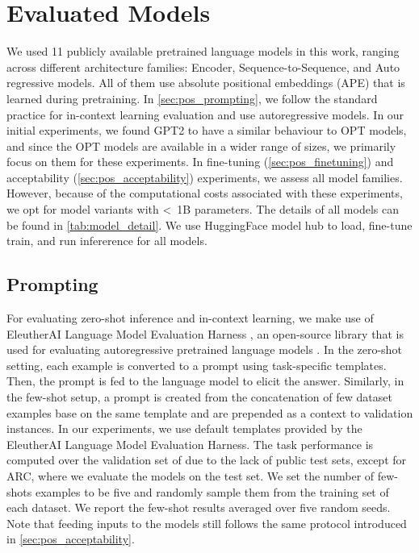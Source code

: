\documentclass[letterpaper, 12pt]{report}
\begin{document}
\section{Evaluated Models}
\label{sec:pos_evaluated_models}


We used 11 publicly available pretrained language models in this work, ranging across different architecture families: Encoder, Sequence-to-Sequence, and Auto regressive models. All of them use absolute positional embeddings (APE) that is learned during pretraining. In \autoref{sec:pos_prompting}, we follow the standard practice for in-context learning evaluation \citep{Brown2020:GPT3,Black2022:GPTNeoX, lm-eval-harness} and use autoregressive models. In our initial experiments, we found GPT2 to have a similar behaviour to OPT models, and since the OPT models are available in a wider range of sizes, we primarily focus on them for these experiments.
In fine-tuning (\autoref{sec:pos_finetuning}) and acceptability (\autoref{sec:pos_acceptability}) experiments, we assess all model families. However, because of the computational costs associated with these experiments, we opt for model variants with \textless~1B parameters. The details of all models can be found in \autoref{tab:model_detail}. We use HuggingFace \citep{huggingface} model hub to load, fine-tune train, and run infererence for all models.




\subsection{Prompting}
\label{sec:pos_prompting}
For evaluating zero-shot inference and in-context learning, we make use of EleutherAI Language Model Evaluation Harness \citep{lm-eval-harness}, an open-source library that is used for evaluating autoregressive pretrained language models \citep{Black2022:GPTNeoX}.
In the zero-shot setting, each example is converted to a prompt using task-specific templates. Then, the prompt is fed to the language model to elicit the answer. Similarly, in the few-shot setup, a prompt is created from the concatenation of few dataset examples base on the same template and are prepended as a context to validation instances.
In our experiments, we use default templates provided by the EleutherAI Language Model Evaluation Harness. The task performance is computed over the validation set of due to the lack of public test sets, except for ARC, where we evaluate the models on the test set.
We set the number of few-shots examples to be five and randomly sample them from the training set of each dataset. We report the few-shot results averaged over five random seeds. Note that feeding inputs to the models still follows the same protocol introduced in \autoref{sec:pos_acceptability}.
\end{document}
